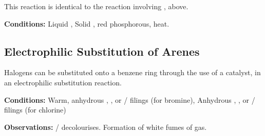 				This reaction is identical to the reaction involving , above.

				\vspace{1.5em}
				\vbox{\textbf{Conditions:}	\tabto{35mm}Liquid , 
											\tabto{35mm}Solid , {\color{Red}red} phosphorous, heat.}





		\subsection{Electrophilic Substitution of Arenes}

			Halogens can be substituted onto a benzene ring through the use of a catalyst, in an electrophilic substitution reaction.

			\vspace{1.5em}
			\vbox{\textbf{Conditions:}	\tabto{35mm}Warm, anhydrous , , or  /
										\ch{\Al} filings (for bromine),
										\tabto{35mm}Anhydrous , , or
													 / \ch{\Al} filings (for chlorine)}

			\vspace{0.75em}
			\vbox{\textbf{Observations:}\tabto{35mm}  /
										  decolourises.
										\tabto{35mm}Formation of white fumes of  gas.}


